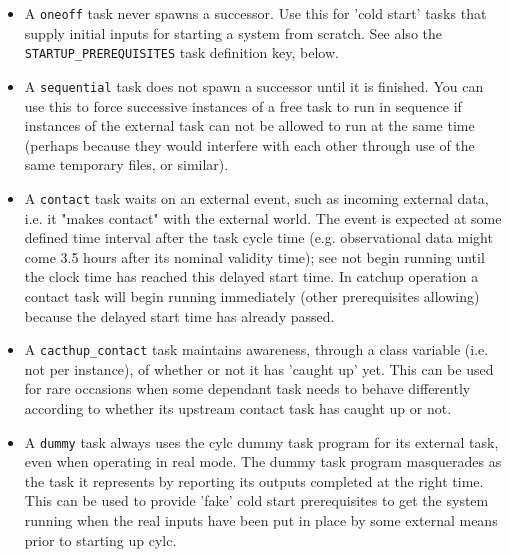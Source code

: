 \documentclass[11pt,a4paper]{article}
\begin{document}
\begin{itemize}
    \item A \lstinline=oneoff= task never spawns a successor. Use this for 
        'cold start' tasks that supply initial inputs for starting a
        system from scratch.  See also the
        \lstinline=STARTUP_PREREQUISITES=
        task definition key, below.

    \item A \lstinline=sequential= task does not spawn a successor until it is
        finished. You can use this to force successive instances of a
        free task to run in sequence if instances of the external task
        can not be allowed to run at the same time (perhaps because they
        would interfere with each other through use of the same
        temporary files, or similar).

    \item A \lstinline=contact= task waits on an external event, such as
        incoming external data, i.e. it "makes contact" with the
        external world.  The event is expected at some defined time
        interval after the task cycle time (e.g. observational data
        might come 3.5 hours after its nominal validity time); see
        not begin running until the clock time has reached this delayed
        start time. In catchup operation a contact task will begin
        running immediately (other prerequisites allowing) because the
        delayed start time has already passed.  
        
    \item A \lstinline=cacthup_contact= task maintains awareness,
        through a class variable (i.e. not per instance), of whether or
        not it has 'caught up' yet.  This can be used for rare occasions
        when some dependant task needs to behave differently according
        to whether its upstream contact task has caught up or not.

    \item A \lstinline=dummy= task always uses the cylc dummy task
        program for its external task, even when operating in real mode.
        The dummy task program masquerades as the task it represents by
        reporting its outputs completed at the right time. This can be
        used to provide 'fake' cold start prerequisites to get the
        system running when the real inputs have been put in place by
        some external means prior to starting up cylc.

\end{itemize}
\end{document}
